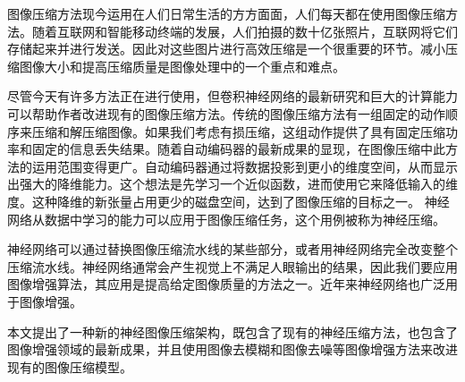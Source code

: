 
\begin{cabstract}

    图像压缩方法现今运用在人们日常生活的方方面面，人们每天都在使用图像压缩方法。随着互联网和智能移动终端的发展，人们拍摄的数十亿张照片，互联网将它们存储起来并进行发送。因此对这些图片进行高效压缩是一个很重要的环节。减小压缩图像大小和提高压缩质量是图像处理中的一个重点和难点。

    尽管今天有许多方法正在进行使用，但卷积神经网络的最新研究和巨大的计算能力可以帮助作者改进现有的图像压缩方法。传统的图像压缩方法有一组固定的动作顺序来压缩和解压缩图像。如果我们考虑有损压缩，这组动作提供了具有固定压缩功率和固定的信息丢失结果。随着自动编码器的最新成果的显现，在图像压缩中此方法的运用范围变得更广。自动编码器通过将数据投影到更小的维度空间，从而显示出强大的降维能力。这个想法是先学习一个近似函数，进而使用它来降低输入的维度。这种降维的新张量占用更少的磁盘空间，达到了图像压缩的目标之一。 神经网络从数据中学习的能力可以应用于图像压缩任务，这个用例被称为神经压缩。

    神经网络可以通过替换图像压缩流水线的某些部分，或者用神经网络完全改变整个压缩流水线。神经网络通常会产生视觉上不满足人眼输出的结果，因此我们要应用图像增强算法，其应用是提高给定图像质量的方法之一。近年来神经网络也广泛用于图像增强。

    本文提出了一种新的神经图像压缩架构，既包含了现有的神经压缩方法，也包含了图像增强领域的最新成果，并且使用图像去模糊和图像去噪等图像增强方法来改进现有的图像压缩模型。

\end{cabstract}

